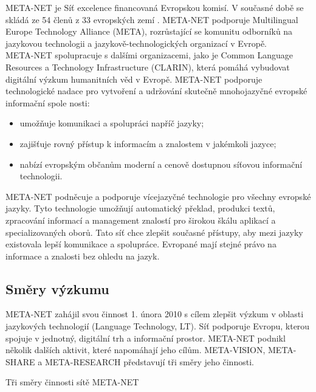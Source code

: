 \begin{multicols}{2}

META-NET je Síť excelence financovaná Evropskou komisí. V současné době se skládá ze 54 členů z 33 evropských zemí \cite{rehm2011}. META-NET podporuje Multilingual Europe Technology Alliance (META), rozrůstající se komunitu odborníků na jazykovou technologii a jazykově-technologických organizací v Evropě.\\
META-NET spolupracuje s dalšími organizacemi, jako je Common Language Resources a Technology Infrastructure (CLARIN), která pomáhá vybudovat digitální výzkum humanitních věd v Evropě. META-NET podporuje technologické nadace pro vytvoření a udržování skutečně mnohojazyčné evropské informační spole nosti:
    \begin{itemize}
      \item umožňuje komunikaci a spolupráci napříč jazyky;
      \item zajišťuje rovný přístup k informacím a znalostem v jakémkoli jazyce;
      \item nabízí evropským občanům moderní a cenově dostupnou síťovou informační technologii.
    \end{itemize}
META-NET podněcuje a podporuje vícejazyčné technologie pro všechny evropské jazyky. Tyto technologie umožňují automatický překlad, produkci textů, zpracování informací a management znalostí pro širokou škálu aplikací a specializovaných oborů. Tato síť chce zlepšit současné přístupy, aby mezi jazyky existovala lepší komunikace a spolupráce. Evropané mají stejné právo na informace a znalosti bez ohledu na jazyk.

\subsection{Směry výzkumu}

META-NET zahájil svou činnost 1. února 2010 s cílem zlepšit výzkum v oblasti jazykových technologií (Language Technology, LT). Síť podporuje Evropu, kterou spojuje v jednotný, digitální trh a informační prostor. META-NET podnikl několik dalších aktivit, které napomáhají jeho cílům. META-VISION, META-SHARE a META-RESEARCH představují tři směry jeho činnosti.

Tři směry činnosti sítě META-NET


\end{multicols}
